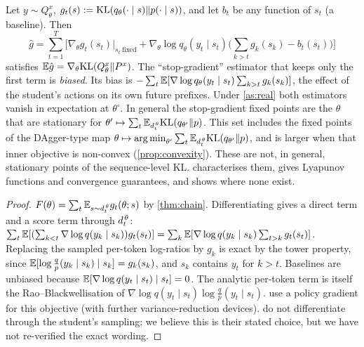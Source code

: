 \begin{proposition}\label{prop:rb-reverse}
\Pv\Ck Let $y\sim Q^x_\theta$, $g_t(s):=\mathrm{KL}(q_\theta(\cdot\mid s)\|p(\cdot\mid s))$, and let $b_t$ be any function of $s_t$
(a baseline). Then
\[
\hat g=\sum_{t=1}^T\Big[\nabla_\theta g_t(s_t)\big|_{s_t\ \text{fixed}}+\nabla_\theta\log q_\theta(y_t\mid s_t)\Big(\sum_{k>t}g_k(s_k)-b_t(s_t)\Big)\Big]
\]
satisfies $\mathbb{E}\hat g=\nabla_\theta\mathrm{KL}(Q^x_\theta\|P^{x})$. The ``stop-gradient'' estimator that keeps only the first
term is \emph{biased}. Its bias is $-\sum_t\mathbb{E}[\nabla\log q_\theta(y_t\mid s_t)\sum_{k>t}g_k(s_k)]$, the effect of the
student's actions on its own future prefixes. Under \cref{as:real} both estimators vanish in expectation
at $\theta^\circ$. In general the stop-gradient fixed points are the $\theta$ that are stationary for
$\theta'\mapsto\sum_t\mathbb{E}_{d^{\,\theta}_{t}}\mathrm{KL}(q_{\theta'}\|p)$. This set includes the fixed points of the DAgger-type map
$\theta\mapsto\operatorname*{arg\,min}_{\theta'}\sum_t\mathbb{E}_{d^{\,\theta}_{t}}\mathrm{KL}(q_{\theta'}\|p)$, and is larger when that inner objective is
non-convex (\cref{prop:convexity}). These are not, in general, stationary points of the sequence-level KL.
 characterises them, gives Lyapunov functions and convergence guarantees, and shows where none exist.
\end{proposition}
\begin{proof}
$F(\theta)=\sum_t\mathbb{E}_{s\sim d^{\,\theta}_{t}}g_t(\theta;s)$ by \cref{thm:chain}. Differentiating gives a direct term and a
score term through $d^{\,\theta}_{t}$:
$\sum_t\mathbb{E}[(\sum_{k<t}\nabla\log q(y_k\mid s_k))g_t(s_t)]=\sum_k\mathbb{E}[\nabla\log q(y_k\mid s_k)\sum_{t>k}g_t(s_t)]$.
Replacing the sampled per-token log-ratios by $g_k$ is exact by the tower property, since
$\mathbb{E}[\log\frac{q}{p}(y_k\mid s_k)\mid s_k]=g_k(s_k)$, and $s_k$ contains $y_t$ for $k>t$. Baselines are unbiased
because $\mathbb{E}[\nabla\log q(y_t\mid s_t)\mid s_t]=0$. The analytic per-token term is itself the
Rao--Blackwellisation of $\nabla\log q(y_t\mid s_t)\log\frac q p(y_t\mid s_t)$.
\citet{gu2024minillm} use a policy gradient for this objective (with further variance-reduction
devices). \citet{agarwal2024gkd} do not differentiate through the student's sampling; we believe this is
their stated choice, but we have not re-verified the exact wording.
\end{proof}

